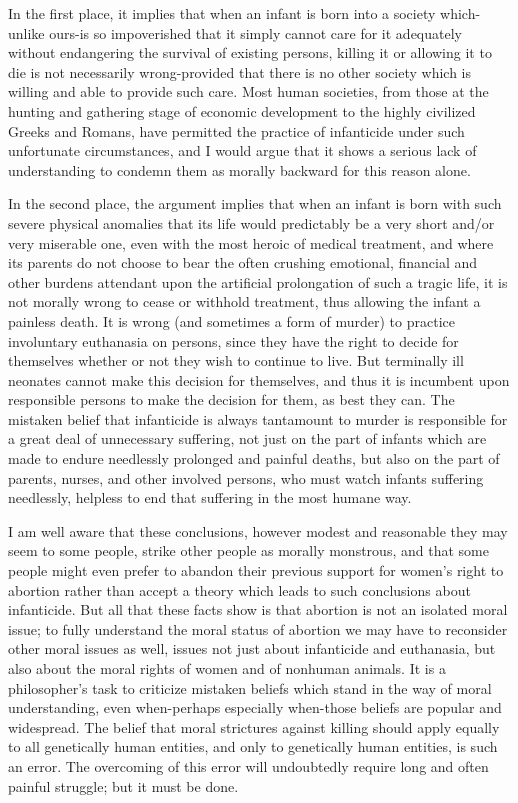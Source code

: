 In the first place, it implies that when an infant is born
into a society which-unlike ours-is so impoverished that it
simply cannot care for it adequately without endangering
the survival of existing persons, killing it or allowing it to
die is not necessarily wrong-provided that there is no
other society which is willing and able to provide such
care. Most human societies, from those at the hunting and
gathering stage of economic development to the highly
civilized Greeks and Romans, have permitted the practice
of infanticide under such unfortunate circumstances, and I
would argue that it shows a serious lack of understanding
to condemn them as morally backward for this reason
alone.

In the second place, the argument implies that when an
infant is born with such severe physical anomalies that its
life would predictably be a very short and/or very
miserable one, even with the most heroic of medical
treatment, and where its parents do not choose to bear the
often crushing emotional, financial and other burdens
attendant upon the artificial prolongation of such a tragic
life, it is not morally wrong to cease or withhold
treatment, thus allowing the infant a painless death. It is
wrong (and sometimes a form of murder) to practice
involuntary euthanasia on persons, since they have the
right to decide for themselves whether or not they wish to
continue to live. But terminally ill neonates cannot make
this decision for themselves, and thus it is incumbent
upon responsible persons to make the decision for them,
as best they can. The mistaken belief that infanticide is
always tantamount to murder is responsible for a great
deal of unnecessary suffering, not just on the part of
infants which are made to endure needlessly prolonged
and painful deaths, but also on the part of parents, nurses,
and other involved persons, who must watch infants
suffering needlessly, helpless to end that suffering in the
most humane way.

I am well aware that these conclusions, however modest
and reasonable they may seem to some people, strike
other people as morally monstrous, and that some people
might even prefer to abandon their previous support for
women’s right to abortion rather than accept a theory
which leads to such conclusions about infanticide. But all
that these facts show is that abortion is not an isolated
moral issue; to fully understand the moral status of
abortion we may have to reconsider other moral issues as
well, issues not just about infanticide and euthanasia, but
also about the moral rights of women and of nonhuman
animals. It is a philosopher’s task to criticize mistaken
beliefs which stand in the way of moral understanding,
even when-perhaps especially when-those beliefs are
popular and widespread. The belief that moral strictures
against killing should apply equally to all genetically
human entities, and only to genetically human entities, is
such an error. The overcoming of this error will
undoubtedly require long and often painful struggle; but it
must be done.
\setcounter{footnote}{\thefe}
